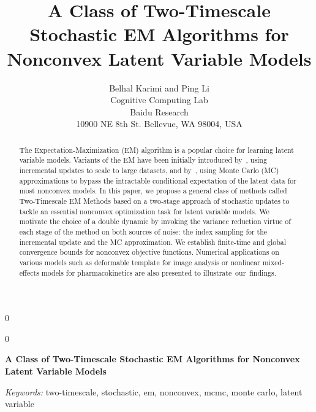 \documentclass[12pt]{article}
\newcommand{\blind}{0}
\begin{document}
\def\spacingset#1{\renewcommand{\baselinestretch}%
{#1}\small\normalsize} \spacingset{1}



\blind
{
  \title{\bf A Class of Two-Timescale Stochastic EM Algorithms for Nonconvex Latent Variable Models}
  \author{Belhal Karimi and Ping Li\hspace{.2cm}\\
    Cognitive Computing Lab \\
    Baidu Research \\
    10900 NE 8th St. Bellevue, WA 98004, USA}
  \maketitle
} \fi

\blind
{
  \bigskip
  \bigskip
  \bigskip
  \begin{center}
    {\LARGE\bf A Class of Two-Timescale Stochastic EM Algorithms for Nonconvex Latent Variable Models}
\end{center}
  \medskip
} \fi

\bigskip
\begin{abstract}
\noindent The Expectation-Maximization (EM) algorithm is a popular choice for learning latent variable models. 
Variants of the EM have been initially introduced by~\citet{neal1998view}, using incremental updates to scale to large datasets, and by~\citet{wei1990monte, delyon1999}, using Monte Carlo (MC) approximations to bypass the intractable conditional expectation of the latent data for most nonconvex models.
In this paper, we propose a general class of methods called Two-Timescale EM Methods based on a two-stage approach of stochastic updates to tackle an essential nonconvex optimization task for latent variable models.
We motivate the choice of a double dynamic by invoking the variance reduction virtue of each stage of the method on both sources of noise: the index sampling for the incremental update and the MC approximation.
We establish finite-time and global convergence bounds for nonconvex objective functions.
Numerical applications on various models such as deformable template for {image analysis} or nonlinear mixed-effects models for {pharmacokinetics} are also presented to illustrate~our~findings.\\
\end{abstract}

\noindent%
{\it Keywords:}  two-timescale, stochastic, em, nonconvex, mcmc, monte carlo, latent variable
\end{document}
